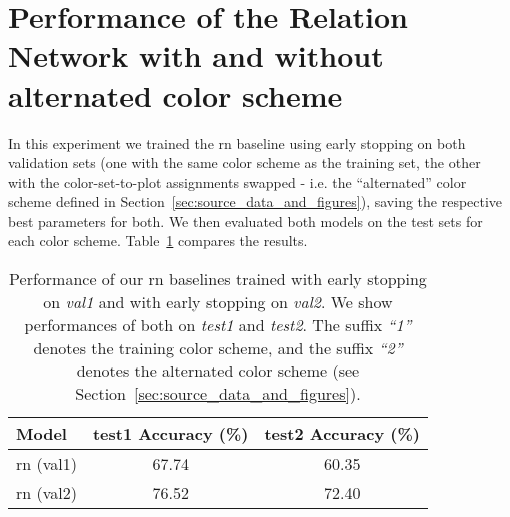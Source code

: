 \documentclass{article} \usepackage{iclr2018_workshop,times}
\def\bestrntestone{76.52} \def\bestrntesttwo{72.40} \def\bestcnntesttwo{56.00} \def\bestvggtesttwo{52.47} \def\besttexttesttwo{50.01} \def\besthumantesttwohuman{91.21} \def\bestcnntesttwohuman{56.04} \def\bestrntesttwohuman{72.18} \def\bestrnonevalone{67.95} \def\bestrnonevaltwo{60.60} \def\bestrnonetestone{67.74} \def\bestrnonetesttwo{60.35}
\begin{document}
\section{Performance of the Relation Network with and without alternated color scheme}
\label{sec:early_stop}
In this experiment we trained the \gls{rn} baseline using early stopping on both validation sets (one with the same color scheme as the training set, the other with the color-set-to-plot assignments swapped - i.e. the ``alternated'' color scheme defined in Section~\ref{sec:source_data_and_figures}), saving the respective best parameters for both. We then evaluated both models on the test sets for each color scheme. Table~\ref{tab:acc_early_stop} compares the results.
\begin{table}[h]
    \caption{Performance of our \gls{rn} baselines trained with early stopping on \emph{val1} and with early stopping on \emph{val2}. We show performances of both on \emph{test1} and \emph{test2}. The suffix \emph{``1''} denotes the training color scheme, and the suffix \emph{``2''} denotes the alternated color scheme (see Section~\ref{sec:source_data_and_figures}).}
    \label{tab:acc_early_stop}
    \begin{center}
        \begin{tabular}{lcc}
            \toprule
            Model & test1 Accuracy  (\%) & test2 Accuracy  (\%) \\
            \midrule
            \gls{rn} (val1) & \bestrnonetestone & \bestrnonetesttwo \\ \gls{rn} (val2) & \bestrntestone & \bestrntesttwo \\ \bottomrule
        \end{tabular}
    \end{center}
\end{table}
\end{document}

